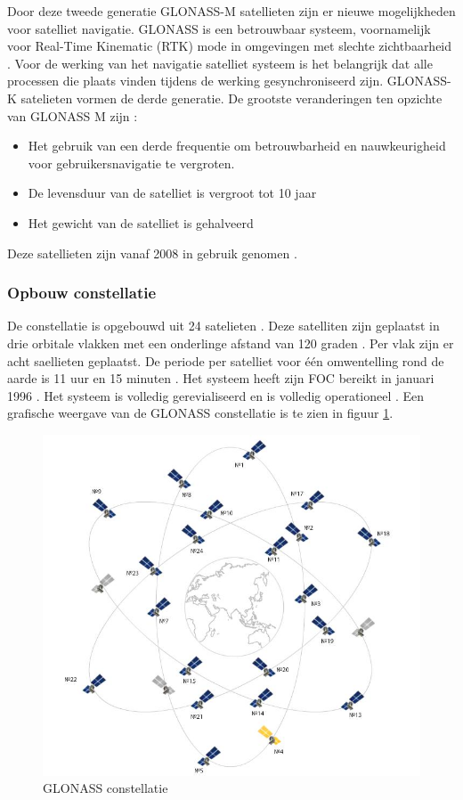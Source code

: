 Door deze tweede generatie GLONASS-M satellieten zijn er nieuwe mogelijkheden voor satelliet navigatie. GLONASS is een betrouwbaar systeem, voornamelijk voor Real-Time Kinematic (RTK) mode in omgevingen met slechte zichtbaarheid \cite{LBibGLONASS}. Voor de werking van het navigatie satelliet systeem is het belangrijk dat alle processen die plaats vinden tijdens de werking gesynchroniseerd zijn. GLONASS-K satelieten vormen de derde generatie. De grootste veranderingen ten opzichte van GLONASS M zijn \cite{LBibGLONASS2}:
\begin{itemize}
	\item Het gebruik van een derde frequentie om betrouwbarheid en nauwkeurigheid voor gebruikersnavigatie te vergroten.
	\item De levensduur van de satelliet is vergroot tot 10 jaar
	\item Het gewicht van de satelliet is gehalveerd
\end{itemize}
Deze satellieten zijn vanaf 2008 in gebruik genomen \cite{LBibPPP}.

\subsubsection{Opbouw constellatie} 
De constellatie is opgebouwd uit 24 satelieten \cite{LBibGNSS4}. Deze satelliten zijn geplaatst in drie orbitale vlakken met een onderlinge afstand van 120 graden \cite{LBibGLONASS2,LBibGNSS6, LBibGNSS8}. Per vlak zijn er acht saellieten geplaatst. De periode per satelliet voor \'e\'en omwentelling rond de aarde is 11 uur en 15 minuten \cite{LBibGNSS6}.  Het systeem heeft zijn FOC bereikt in januari 1996 \cite{LBibGLONASS}. Het systeem is volledig gerevialiseerd en is volledig operationeel \cite{LBibGNSS4}. Een grafische weergave van de GLONASS constellatie is te zien in figuur \ref{imgGLONASS}.

\begin{figure}[hpb]
	\includegraphics[scale=0.5]{GLONASS.jpg}
	\caption{GLONASS constellatie \cite{LImgGLONASS}}
	\label{imgGLONASS}
\end{figure}

